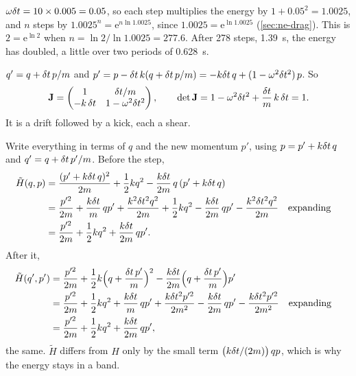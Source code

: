$\omega\delta t = 10\times0.005 = 0.05$, so each
step multiplies the energy by $1 + 0.05^2 = 1.0025$, and $n$ steps by
$1.0025^n = \mathrm{e}^{n\ln 1.0025}$, since $1.0025 = \mathrm{e}^{\ln
1.0025}$ (\cref{sec:ne-drag}). This is $2 = \mathrm{e}^{\ln 2}$ when $n =
\ln 2/\ln 1.0025 = 277.6$. After 278 steps, \SI{1.39}{\second}, the energy
has doubled, a little over two periods of \SI{0.628}{\second}.

$q' = q + \delta t\,p/m$ and $p' = p - \delta t\,k(q +
\delta t\,p/m) = -k\delta t\,q + (1 - \omega^2\delta t^2)\,p$. So
\begin{equation*}
   \bm{\mathrm{J}} = \begin{pmatrix} 1 & \delta t/m\\ -k\,\delta t & 1 - \omega^2\delta t^2
   \end{pmatrix} ,
   \qquad
   \det\bm{\mathrm{J}} = 1 - \omega^2\delta t^2 + \frac{\delta t}{m}\,k\,\delta t = 1 .
\end{equation*}
It is a drift followed by a kick, each a shear.

Write everything in terms of $q$ and the new
momentum $p'$, using $p = p' + k\delta t\,q$ and $q' = q + \delta t\,p'/m$. Before
the step,
\begin{align*}
   \tilde{H}(q, p) &= \frac{(p' + k\delta t\,q)^2}{2m} + \frac12 kq^2
   - \frac{k\delta t}{2m}\,q\,(p' + k\delta t\,q)\\
   &= \frac{p'^2}{2m} + \frac{k\delta t}{m}\,qp' + \frac{k^2\delta t^2q^2}{2m}
   + \frac12 kq^2 - \frac{k\delta t}{2m}\,qp' - \frac{k^2\delta t^2q^2}{2m}
   && \text{expanding}\\
   &= \frac{p'^2}{2m} + \frac12 kq^2 + \frac{k\delta t}{2m}\,qp' .
\end{align*}
After it,
\begin{align*}
   \tilde{H}(q', p') &= \frac{p'^2}{2m} + \frac12 k\Bigl(q + \frac{\delta t\,p'}
   {m}\Bigr)^2 - \frac{k\delta t}{2m}\Bigl(q + \frac{\delta t\,p'}{m}\Bigr)p'\\
   &= \frac{p'^2}{2m} + \frac12 kq^2 + \frac{k\delta t}{m}\,qp'
   + \frac{k\delta t^2p'^2}{2m^2} - \frac{k\delta t}{2m}\,qp'
   - \frac{k\delta t^2p'^2}{2m^2}
   && \text{expanding}\\
   &= \frac{p'^2}{2m} + \frac12 kq^2 + \frac{k\delta t}{2m}\,qp' ,
\end{align*}
the same. $\tilde{H}$ differs from $H$ only by the small term
$\bigl(k\delta t/(2m)\bigr)\,qp$, which is why the energy stays in a band.
